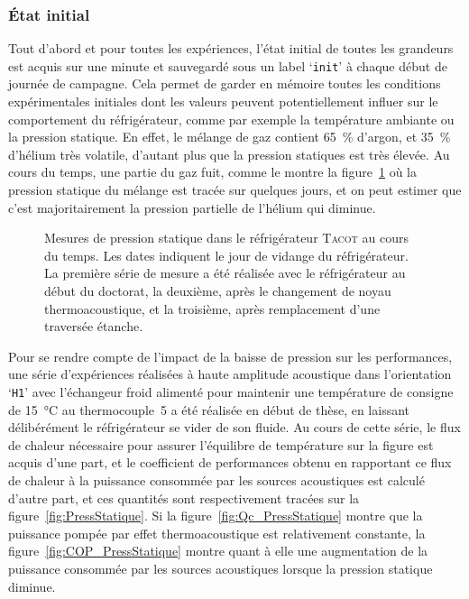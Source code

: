 \subsubsection{\'Etat initial}

Tout d'abord et pour toutes les expériences, l'état initial de toutes les grandeurs est acquis sur une minute et sauvegardé sous un label `\texttt{init}' à chaque début de journée de campagne. Cela permet de garder en mémoire toutes les conditions expérimentales initiales dont les valeurs peuvent potentiellement influer sur le comportement du réfrigérateur, comme par exemple la température ambiante ou la pression statique. En effet, le mélange de gaz contient \qty{65}{\percent} d'argon, et \qty{35}{\percent} d'hélium très volatile, d'autant plus que la pression statiques est très élevée. Au cours du temps, une partie du gaz fuit, comme le montre la figure~\ref{fig:TenuePressionStatique} où la pression statique du mélange est tracée sur quelques jours, et on peut estimer que c'est majoritairement la pression partielle de l'hélium qui diminue.\smallskip

\begin{figure}[!ht]
	\centering
	
	\caption{Mesures de pression statique dans le réfrigérateur \textsc{Tacot} au cours du temps. Les dates indiquent le jour de vidange du réfrigérateur. La première série de mesure a été réalisée avec le réfrigérateur au début du doctorat, la deuxième, après le changement de noyau thermoacoustique, et la troisième, après remplacement d'une traversée étanche.}
	\label{fig:TenuePressionStatique}
\end{figure}

Pour se rendre compte de l'impact de la baisse de pression sur les performances, une série d'expériences réalisées à haute amplitude acoustique dans l'orientation `\texttt{H1}' avec l'échangeur froid alimenté pour maintenir une température de consigne de \qty{15}{\degreeCelsius} au thermocouple~\num{5} a été réalisée en début de thèse, en laissant délibérément le réfrigérateur se vider de son fluide. Au cours de cette série, le flux de chaleur nécessaire pour assurer l'équilibre de température sur la figure est acquis d'une part, et le coefficient de performances obtenu en rapportant ce flux de chaleur à la puissance consommée par les sources acoustiques est calculé d'autre part, et ces quantités sont respectivement tracées sur la figure~\ref{fig:PressStatique}. Si la figure~\ref{fig:Qc_PressStatique} montre que la puissance pompée par effet thermoacoustique est relativement constante, la figure~\ref{fig:COP_PressStatique} montre quant à elle une augmentation de la puissance consommée par les sources acoustiques lorsque la pression statique diminue.\medskip

